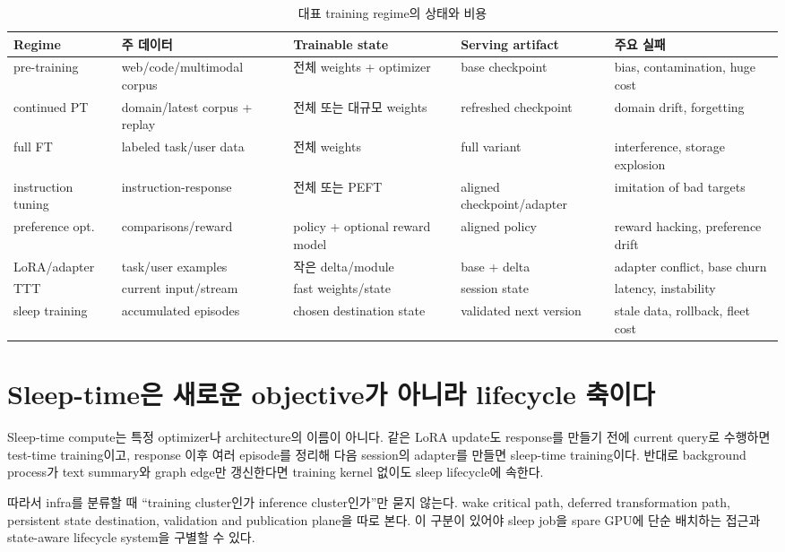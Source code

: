 \begin{table}[htbp]
\centering
\caption{대표 training regime의 상태와 비용}
\label{tab:bg-training-regimes}
\small
\begin{tabularx}{\textwidth}{L{0.16\textwidth}L{0.17\textwidth}L{0.18\textwidth}YY}
\toprule
Regime & 주 데이터 & Trainable state & Serving artifact & 주요 실패 \\
\midrule
pre-training & web/code/multimodal corpus & 전체 weights + optimizer & base checkpoint & bias, contamination, huge cost \\
continued PT & domain/latest corpus + replay & 전체 또는 대규모 weights & refreshed checkpoint & domain drift, forgetting \\
full FT & labeled task/user data & 전체 weights & full variant & interference, storage explosion \\
instruction tuning & instruction-response & 전체 또는 PEFT & aligned checkpoint/adapter & imitation of bad targets \\
preference opt. & comparisons/reward & policy + optional reward model & aligned policy & reward hacking, preference drift \\
LoRA/adapter & task/user examples & 작은 delta/module & base + delta & adapter conflict, base churn \\
TTT & current input/stream & fast weights/state & session state & latency, instability \\
sleep training & accumulated episodes & chosen destination state & validated next version & stale data, rollback, fleet cost \\
\bottomrule
\end{tabularx}
\end{table}

\section{Sleep-time은 새로운 objective가 아니라 lifecycle 축이다}

Sleep-time compute는 특정 optimizer나 architecture의 이름이 아니다. 같은 LoRA update도
response를 만들기 전에 current query로 수행하면 test-time training이고, response 이후
여러 episode를 정리해 다음 session의 adapter를 만들면 sleep-time training이다. 반대로
background process가 text summary와 graph edge만 갱신한다면 training kernel 없이도 sleep
lifecycle에 속한다.

따라서 infra를 분류할 때 ``training cluster인가 inference cluster인가''만 묻지 않는다.
wake critical path, deferred transformation path, persistent state destination, validation and
publication plane을 따로 본다. 이 구분이 있어야 sleep job을 spare GPU에 단순 배치하는 접근과
state-aware lifecycle system을 구별할 수 있다.
